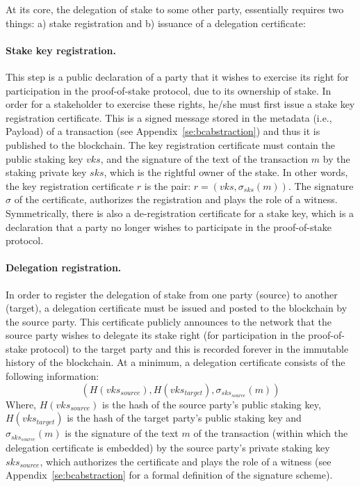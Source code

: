 At its core, the delegation of stake to some other party, essentially requires
two things: a) stake registration and b) issuance of a delegation certificate:

\paragraph{Stake key registration.}
This step is a public declaration of a party that it wishes to exercise its
right for participation in the proof-of-stake protocol, due to its ownership of
stake. In order for a stakeholder to exercise these rights, he/she must first
issue a stake key registration certificate. This is a signed message stored in
the metadata (i.e., Payload) of a transaction (see
Appendix~\ref{se:bcabstraction}) and thus it is published to the blockchain. The
key registration certificate must contain the public staking key $vks$, and the
signature of the text of the transaction $m$ by the staking private key $sks$,
which is the rightful owner of the stake. In other words, the key registration
certificate $r$ is the pair: $r = (vks, \sigma_{sks}(m))$. The signature
$\sigma$ of the certificate, authorizes the registration and plays the role of a
witness.
Symmetrically, there is also a de-registration certificate for a stake key,
which is a declaration that a party no longer wishes to participate in the
proof-of-stake protocol.

\paragraph{Delegation registration.}
In order to register the delegation of stake from one party (source) to another
(target), a delegation certificate must be issued and posted to the blockchain
by the source party. This certificate publicly announces to the network that the
source party wishes to delegate its stake right (for participation in the
proof-of-stake protocol) to the target party and this is recorded forever in the
immutable history of the blockchain. At a minimum, a delegation certificate
consists of the following information:
$$
(H(vks_{source}), H(vks_{target}), \sigma_{sks_{source}}(m))
$$
Where, $H(vks_{source})$ is the hash of the source party's public staking key,
$H(vks_{target})$ is the hash of the target party's public staking key and
$\sigma_{sks_{source}}(m)$ is the signature of the text $m$ of the transaction
(within which the delegation certificate is embedded) by the source party's
private staking key $sks_{source}$, which authorizes the certificate and plays
the role of a witness (see Appendix~\ref{se:bcabstraction} for a formal
definition of the signature scheme).

